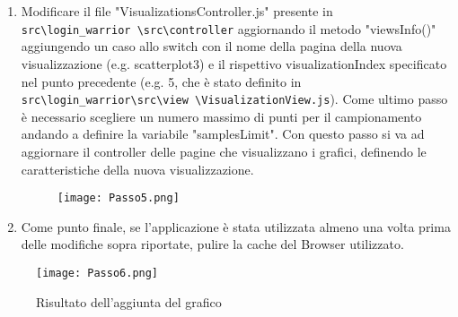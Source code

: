 \begin{enumerate}
    \item Modificare il file "VisualizationsController.js" presente in \texttt{ src\textbackslash login\_warrior \textbackslash src\textbackslash controller} aggiornando il metodo "viewsInfo()" aggiungendo un caso allo switch con il nome della pagina della nuova visualizzazione (e.g. scatterplot3) e il rispettivo visualizationIndex specificato nel punto precedente (e.g. 5, che è stato definito in \texttt{src\textbackslash login\_warrior\textbackslash src\textbackslash view \textbackslash VisualizationView.js}). Come ultimo passo è necessario scegliere un numero massimo di punti per il campionamento andando a definire la variabile "samplesLimit". Con questo passo si va ad aggiornare il controller delle pagine che visualizzano i grafici, definendo le caratteristiche della nuova visualizzazione.
    \begin{figure}[H]
        \centering
        \texttt{[image: Passo5.png]}
      \end{figure}

    \item Come punto finale, se l'applicazione è stata utilizzata almeno una volta prima delle modifiche sopra riportate, pulire la cache del Browser utilizzato.
\end{enumerate}

\begin{figure}[H]
    \centering
    \texttt{[image: Passo6.png]}
    \caption{Risultato dell'aggiunta del grafico}
  \end{figure}
